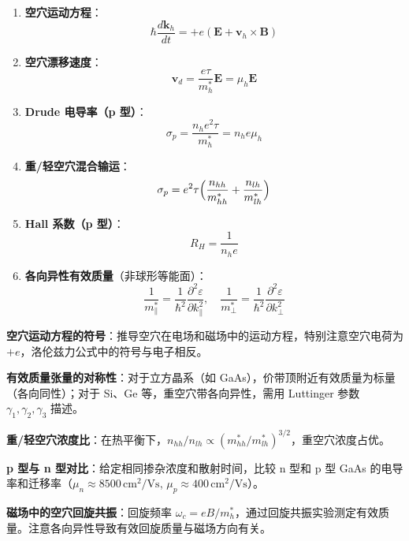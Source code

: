 \begin{formulabox}[核心公式]
\begin{enumerate}[label=\textbf{(\arabic*)}]
    \item \textbf{空穴运动方程}：
    \[
    \hbar\frac{d\mathbf{k}_h}{dt}=+e(\mathbf{E}+\mathbf{v}_h\times\mathbf{B})
    \]

    \item \textbf{空穴漂移速度}：
    \[
    \mathbf{v}_d=\frac{e\tau}{m_h^*}\mathbf{E}=\mu_h\mathbf{E}
    \]

    \item \textbf{Drude 电导率（p 型）}：
    \[
    \sigma_p=\frac{n_h e^2\tau}{m_h^*}=n_h e\mu_h
    \]

    \item \textbf{重/轻空穴混合输运}：
    \[
    \sigma_p=e^2\tau\Bigl(\frac{n_{hh}}{m_{hh}^*}+\frac{n_{lh}}{m_{lh}^*}\Bigr)
    \]

    \item \textbf{Hall 系数（p 型）}：
    \[
    R_H=\frac{1}{n_h e}
    \]

    \item \textbf{各向异性有效质量}（非球形等能面）：
    \[
    \frac{1}{m_{\parallel}^*}=\frac{1}{\hbar^2}\frac{\partial^2\varepsilon}{\partial k_{\parallel}^2},\quad
    \frac{1}{m_{\perp}^*}=\frac{1}{\hbar^2}\frac{\partial^2\varepsilon}{\partial k_{\perp}^2}
    \]
\end{enumerate}
\end{formulabox}

\begin{drillbox}[训练点与考法变体]
 \textbf{空穴运动方程的符号}：推导空穴在电场和磁场中的运动方程，特别注意空穴电荷为 $+e$，洛伦兹力公式中的符号与电子相反。

 \textbf{有效质量张量的对称性}：对于立方晶系（如 GaAs），价带顶附近有效质量为标量（各向同性）；对于 Si、Ge 等，重空穴带各向异性，需用 Luttinger 参数 $\gamma_1,\gamma_2,\gamma_3$ 描述。

 \textbf{重/轻空穴浓度比}：在热平衡下，$n_{hh}/n_{lh}\propto(m_{hh}^*/m_{lh}^*)^{3/2}$，重空穴浓度占优。

 \textbf{p 型与 n 型对比}：给定相同掺杂浓度和散射时间，比较 n 型和 p 型 GaAs 的电导率和迁移率（$\mu_n\approx8500\,\text{cm}^2/\text{Vs}$, $\mu_p\approx400\,\text{cm}^2/\text{Vs}$）。

 \textbf{磁场中的空穴回旋共振}：回旋频率 $\omega_c=eB/m_h^*$，通过回旋共振实验测定有效质量。注意各向异性导致有效回旋质量与磁场方向有关。
\end{drillbox}

